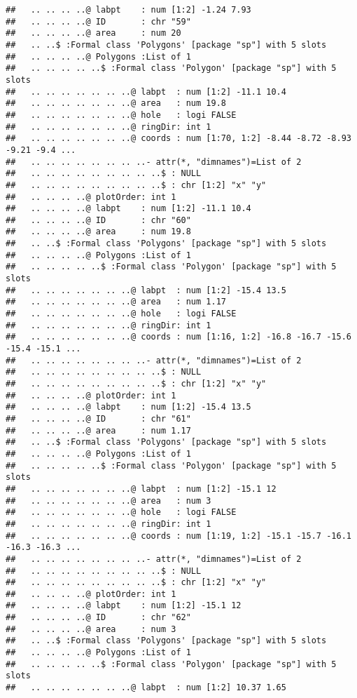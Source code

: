 \documentclass[]{article}
\begin{document}
\begin{verbatim}
##   .. .. .. ..@ labpt    : num [1:2] -1.24 7.93
##   .. .. .. ..@ ID       : chr "59"
##   .. .. .. ..@ area     : num 20
##   .. ..$ :Formal class 'Polygons' [package "sp"] with 5 slots
##   .. .. .. ..@ Polygons :List of 1
##   .. .. .. .. ..$ :Formal class 'Polygon' [package "sp"] with 5 slots
##   .. .. .. .. .. .. ..@ labpt  : num [1:2] -11.1 10.4
##   .. .. .. .. .. .. ..@ area   : num 19.8
##   .. .. .. .. .. .. ..@ hole   : logi FALSE
##   .. .. .. .. .. .. ..@ ringDir: int 1
##   .. .. .. .. .. .. ..@ coords : num [1:70, 1:2] -8.44 -8.72 -8.93 -9.21 -9.4 ...
##   .. .. .. .. .. .. .. ..- attr(*, "dimnames")=List of 2
##   .. .. .. .. .. .. .. .. ..$ : NULL
##   .. .. .. .. .. .. .. .. ..$ : chr [1:2] "x" "y"
##   .. .. .. ..@ plotOrder: int 1
##   .. .. .. ..@ labpt    : num [1:2] -11.1 10.4
##   .. .. .. ..@ ID       : chr "60"
##   .. .. .. ..@ area     : num 19.8
##   .. ..$ :Formal class 'Polygons' [package "sp"] with 5 slots
##   .. .. .. ..@ Polygons :List of 1
##   .. .. .. .. ..$ :Formal class 'Polygon' [package "sp"] with 5 slots
##   .. .. .. .. .. .. ..@ labpt  : num [1:2] -15.4 13.5
##   .. .. .. .. .. .. ..@ area   : num 1.17
##   .. .. .. .. .. .. ..@ hole   : logi FALSE
##   .. .. .. .. .. .. ..@ ringDir: int 1
##   .. .. .. .. .. .. ..@ coords : num [1:16, 1:2] -16.8 -16.7 -15.6 -15.4 -15.1 ...
##   .. .. .. .. .. .. .. ..- attr(*, "dimnames")=List of 2
##   .. .. .. .. .. .. .. .. ..$ : NULL
##   .. .. .. .. .. .. .. .. ..$ : chr [1:2] "x" "y"
##   .. .. .. ..@ plotOrder: int 1
##   .. .. .. ..@ labpt    : num [1:2] -15.4 13.5
##   .. .. .. ..@ ID       : chr "61"
##   .. .. .. ..@ area     : num 1.17
##   .. ..$ :Formal class 'Polygons' [package "sp"] with 5 slots
##   .. .. .. ..@ Polygons :List of 1
##   .. .. .. .. ..$ :Formal class 'Polygon' [package "sp"] with 5 slots
##   .. .. .. .. .. .. ..@ labpt  : num [1:2] -15.1 12
##   .. .. .. .. .. .. ..@ area   : num 3
##   .. .. .. .. .. .. ..@ hole   : logi FALSE
##   .. .. .. .. .. .. ..@ ringDir: int 1
##   .. .. .. .. .. .. ..@ coords : num [1:19, 1:2] -15.1 -15.7 -16.1 -16.3 -16.3 ...
##   .. .. .. .. .. .. .. ..- attr(*, "dimnames")=List of 2
##   .. .. .. .. .. .. .. .. ..$ : NULL
##   .. .. .. .. .. .. .. .. ..$ : chr [1:2] "x" "y"
##   .. .. .. ..@ plotOrder: int 1
##   .. .. .. ..@ labpt    : num [1:2] -15.1 12
##   .. .. .. ..@ ID       : chr "62"
##   .. .. .. ..@ area     : num 3
##   .. ..$ :Formal class 'Polygons' [package "sp"] with 5 slots
##   .. .. .. ..@ Polygons :List of 1
##   .. .. .. .. ..$ :Formal class 'Polygon' [package "sp"] with 5 slots
##   .. .. .. .. .. .. ..@ labpt  : num [1:2] 10.37 1.65

\end{verbatim}
\end{document}
